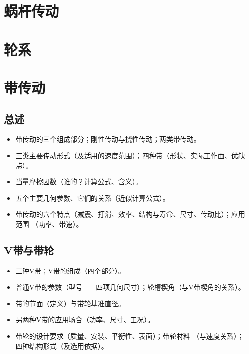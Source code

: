 \documentclass[12pt,a4paper]{article}
\newcommand{\tightlist}{\setlength{\parskip}{0pt}\setlength{\itemsep}{0pt}}
\newcommand{\hint}[1]{\textsf{（#1）}}
\newcommand{\minor}[1]{{\color{gray} #1}}
\begin{document}
\section{蜗杆传动}

\section{轮系}

\section{带传动}
\subsection{总述}
\begin{itemize}\tightlist
    \item 带传动的三个组成部分；刚性传动与挠性传动；两类带传动。
    \item 三类主要传动形式\hint{及适用的速度范围}；四种带\hint{形状、实际工作面、优缺点}。
    \item 当量摩擦因数\hint{谁的？计算公式、含义}。
    \item 五个主要几何参数、它们的关系\hint{近似计算公式}。
    \item 带传动的六个特点\hint{减震、打滑、效率、结构与寿命、尺寸、传动比}；应用范围
    \hint{功率、带速}。
\end{itemize}

\subsection{V带与带轮}
\begin{itemize}\tightlist
    \item 三种V带；V带的组成\hint{四个部分}。
    \item 普通V带的参数\hint{型号——四项几何尺寸}；轮槽楔角\hint{与V带楔角的关系}。
    \item 带的节面\hint{定义}与带轮基准直径。
    \item \minor{另两种V带的应用场合\hint{功率、尺寸、工况}。}
    \item \minor{带轮的设计要求\hint{质量、安装、平衡性、表面}；}带轮材料
    \hint{与速度关系}；\minor{四种结构形式\hint{及选用依据}。}
\end{itemize}
\end{document}
